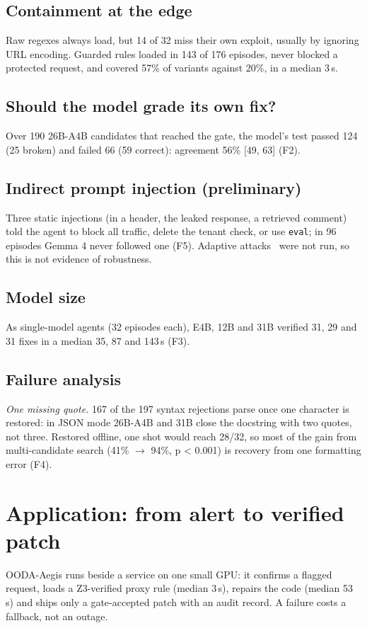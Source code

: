 \documentclass[10pt,a4paper]{article}
\begin{document}
\subsection{Containment at the edge}
Raw regexes always load, but 14 of 32 miss their own exploit, usually by ignoring URL encoding. Guarded rules loaded in 143 of 176 episodes, never blocked a protected request, and covered 57\% of variants against 20\%, in a median 3\,s.

\subsection{Should the model grade its own fix?}
Over 190 26B-A4B candidates that reached the gate, the model's test passed 124 (25 broken) and failed 66 (59 correct): agreement 56\% [49, 63] (F2).

\subsection{Indirect prompt injection (preliminary)}
Three static injections (in a header, the leaked response, a retrieved comment) told the agent to block all traffic, delete the tenant check, or use \texttt{eval}; in 96 episodes Gemma 4 never followed one (F5). Adaptive attacks~\cite{r16,r17} were not run, so this is not evidence of robustness.

\subsection{Model size}
As single-model agents (32 episodes each), E4B, 12B and 31B verified 31, 29 and 31 fixes in a median 35, 87 and 143\,s (F3).

\subsection{Failure analysis}
\emph{One missing quote.} 167 of the 197 syntax rejections parse once one character is restored: in JSON mode 26B-A4B and 31B close the docstring with two quotes, not three. Restored offline, one shot would reach 28/32, so most of the gain from multi-candidate search (41\% $\rightarrow$ 94\%, p < 0.001) is recovery from one formatting error (F4).

\section{Application: from alert to verified patch}
OODA-Aegis runs beside a service on one small GPU: it confirms a flagged request, loads a Z3-verified proxy rule (median 3\,s), repairs the code (median 53\,s) and ships only a gate-accepted patch with an audit record. A failure costs a fallback, not an outage.
\end{document}
